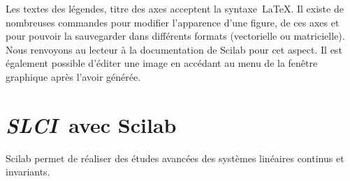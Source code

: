 Les textes des légendes, titre des axes acceptent la syntaxe~\LaTeX.
Il existe de nombreuses commandes pour modifier l'apparence
d'une figure, de ces axes et pour pouvoir la sauvegarder
dans différents formats (vectorielle ou matricielle).
Nous renvoyons au lecteur à la documentation de Scilab pour
cet aspect. Il est également possible d'éditer une image en accédant
au menu de la fenêtre graphique après l'avoir générée.
\clearpage
\section{\emph{{\scshape SLCI}}~avec Scilab}
Scilab permet de réaliser des études avancées des systèmes linéaires continus 
et invariants.
